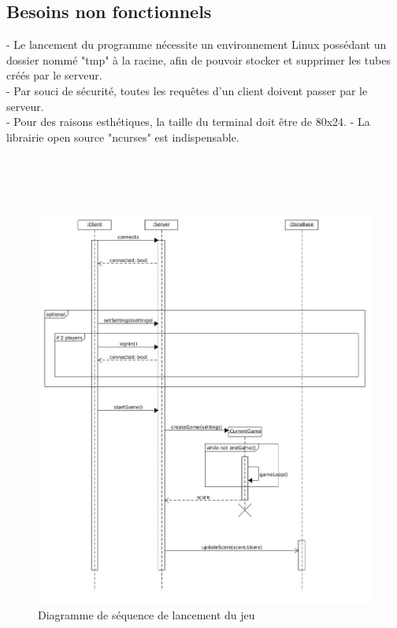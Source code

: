 \documentclass[a4paper,12pt]{article}
\begin{document}
\subsection{Besoins non fonctionnels}

- Le lancement du programme nécessite un environnement Linux possédant un dossier nommé "tmp" à la racine, afin de pouvoir stocker et supprimer les tubes créés par le serveur.\\
- Par souci de sécurité, toutes les requêtes d'un client doivent passer par le serveur.\\
- Pour des raisons esthétiques, la taille du terminal doit être de 80x24.
- La librairie open source "ncurses" est indispensable.


\\
\\\\
\begin{figure}[hbtp]
\centering
\includegraphics[scale=0.3]{images/sequence_diagram_StartGame}
\caption{Diagramme de séquence de lancement du jeu}
\end{figure}
\end{document}
